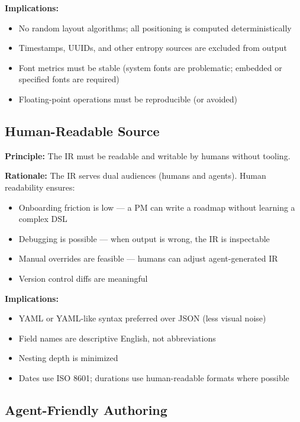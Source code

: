 \textbf{Implications:}
\begin{itemize}
  \item No random layout algorithms; all positioning is computed deterministically
  \item Timestamps, UUIDs, and other entropy sources are excluded from output
  \item Font metrics must be stable (system fonts are problematic; embedded or specified fonts are required)
  \item Floating-point operations must be reproducible (or avoided)
\end{itemize}

\subsection{Human-Readable Source}
\label{principle:human-readable}

\textbf{Principle:} The IR must be readable and writable by humans without tooling.

\textbf{Rationale:} The IR serves dual audiences (humans and agents). Human readability ensures:
\begin{itemize}
  \item Onboarding friction is low — a PM can write a roadmap without learning a complex DSL
  \item Debugging is possible — when output is wrong, the IR is inspectable
  \item Manual overrides are feasible — humans can adjust agent-generated IR
  \item Version control diffs are meaningful
\end{itemize}

\textbf{Implications:}
\begin{itemize}
  \item YAML or YAML-like syntax preferred over JSON (less visual noise)
  \item Field names are descriptive English, not abbreviations
  \item Nesting depth is minimized
  \item Dates use ISO 8601; durations use human-readable formats where possible
\end{itemize}

\subsection{Agent-Friendly Authoring}
\label{principle:agent-friendly}

